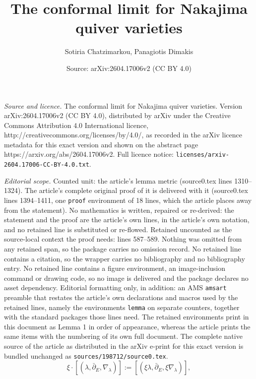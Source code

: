 \documentclass[10pt,a4paper]{amsart}
\title{The conformal limit for Nakajima quiver varieties}
\author{Sotiria Chatzimarkou, Panagiotis Dimakis}
\date{Source: arXiv:2604.17006v2 (CC BY 4.0)}
\newcommand{\pa}{\partial}
\begin{document}
\maketitle

\noindent\emph{Source and licence.} The conformal limit for Nakajima quiver varieties. Version arXiv:2604.17006v2 (CC BY 4.0), distributed by arXiv under the Creative Commons Attribution 4.0 International licence, http://creativecommons.org/licenses/by/4.0/, as recorded in the arXiv licence metadata for this exact version and shown on the abstract page https://arxiv.org/abs/2604.17006v2. Full licence notice: \texttt{licenses/arxiv-2604.17006-CC-BY-4.0.txt}.\par\smallskip

\noindent\textit{Editorial scope.} Counted unit: the article's lemma metric (source0.tex lines 1310--1324). The article's complete original proof of it is delivered with it (source0.tex lines 1394--1411, one \texttt{proof} environment of 18 lines, which the article places away from the statement). No mathematics is written, repaired or re-derived: the statement and the proof are the article's own lines, in the article's own notation, and no retained line is substituted or re-flowed.  Retained uncounted as the source-local context the proof needs: lines 587--589.  Nothing was omitted from any retained span, so the package carries no omission record.  No retained line contains a citation, so the wrapper carries no bibliography and no bibliography entry.  No retained line contains a figure environment, an image-inclusion command or drawing code, so no image is delivered and the package declares no asset dependency.  Editorial formatting only, in addition: an AMS \texttt{amsart} preamble that restates the article's own declarations and macros used by the retained lines, namely the environments \texttt{lemma} on separate counters, together with the standard packages those lines need.  The retained environments print in this document as Lemma 1 in order of appearance, whereas the article prints the same items with the numbering of its own full document.  The complete native source of the article as distributed in the arXiv e-print for this exact version is bundled unchanged as \texttt{sources/198712/source0.tex}.
\begin{equation}\label{CSA}
    \xi\cdot [(\lambda,\bar\pa_E,\nabla_{\lambda})]:= [(\xi\lambda,\bar\pa_E,\xi\nabla_{\lambda})],
\end{equation}
\end{document}
